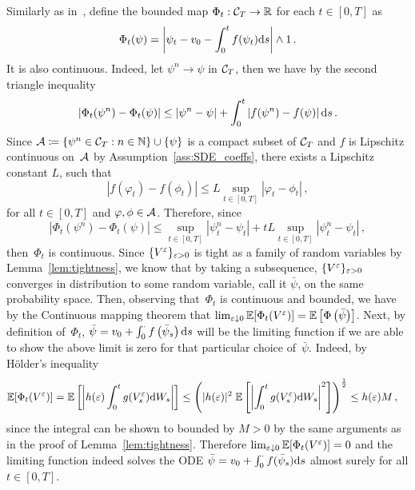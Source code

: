 Similarly as in~\cite{Chiarini2014OnProcesses}, define the bounded map $\Phi_t:\mathcal{C}_T\rightarrow \mathbb{R}$ for each $t\in[0,T]$ as 
$$
\Phi_t(\psi) = \left \vert \psi_t - v_0 - \int_0^t f(\psi_t)\mathrm{d} s \right \vert \land 1\,.
$$
It is also continuous. 
Indeed, let $\psi^n \rightarrow \psi$ in $\mathcal{C}_T$, then we have by the second triangle inequality 
$$
\left \vert \Phi_t(\psi^n) - \Phi_t(\psi) \right \vert \leq  \left \vert \psi^n - \psi \right \vert + \int_0^t \left \vert f(\psi^n) - f(\psi) \right \vert\mathrm{d} s\,.
$$
Since $\mathcal{A}\coloneqq \{\psi^n\in\mathcal{C}_T: n\in\mathbb{N}\}\cup \{\psi\}$ is a compact subset of $\mathcal{C}_T$ and $f$ is Lipschitz continuous on~$\mathcal{A}$ by Assumption~\ref{ass:SDE_coeffs}, there exists a Lipschitz constant $L$, such that
\[
\left\vert f(\varphi_t) - f(\phi_t) \right\vert \leq L \sup_{t\in[0,T]} |\varphi_t - \phi_t|\,,
\]
for all $t\in[0,T]$ and $\varphi, \phi\in\mathcal{A}$. Therefore, since
\[
\left \vert \Phi_t(\psi^n) - \Phi_t(\psi) \right \vert \leq \sup_{t\in[0,T]} \left \vert\psi_t^n - \psi_t\right \vert + t L \sup_{t\in[0,T]} \left \vert\psi_t^n - \psi_t\right \vert\,,
\]
then~$\Phi_t$ is continuous. Since $\{V^\varepsilon\}_{\varepsilon>0}$ is tight as a family of random variables by Lemma~\ref{lem:tightness}, we know that by taking a subsequence, $\{V^\varepsilon\}_{\varepsilon>0}$ converges in distribution to some random variable, call it $\bar\psi$, on the same probability space. 
Then, observing that~$\Phi_t$ is continuous and bounded, we have by the Continuous mapping theorem that $\lim_{\varepsilon\downarrow 0} \mathbb{E}[\Phi_t(V^\varepsilon)]=\mathbb{E}\left[\Phi\left(\bar\psi\right)\right]$. Next, by definition of~$\Phi_t$, $\bar{\psi}=v_0 + \int_0^\cdot f\left(\bar{\psi}_s\right)\mathrm{d} s$ will be the limiting function if we are able to show the above limit is zero for that particular choice of~$\bar\psi$. Indeed, by H{\"o}lder's inequality %
\begin{align*}
\EE[\Phi_t(V^\eps)]
 = \EE\left[\left\vert h(\eps) \int_0^t g(V_s^\eps) \D W_s \right\vert\right]
  & \leq \left( |h(\eps)|^2 \; \EE\left[\left\vert \int_0^t g(V_s^\eps) \D W_s \right\vert^2\right] \right)^{\frac{1}{2}} %
  \leq h(\eps) M\,,
\end{align*}
since the integral can be shown to bounded by $M>0$ by the same arguments as in the proof of Lemma~\ref{lem:tightness}. Therefore $\lim_{\varepsilon\downarrow 0} \mathbb{E}[\Phi_t(V^\varepsilon)] = 0$ and the limiting function indeed solves the ODE $\bar{\psi}=v_0 + \int_0^\cdot f(\bar{\psi}_s)\mathrm{d} s$ almost surely for all $t\in[0,T]$.


